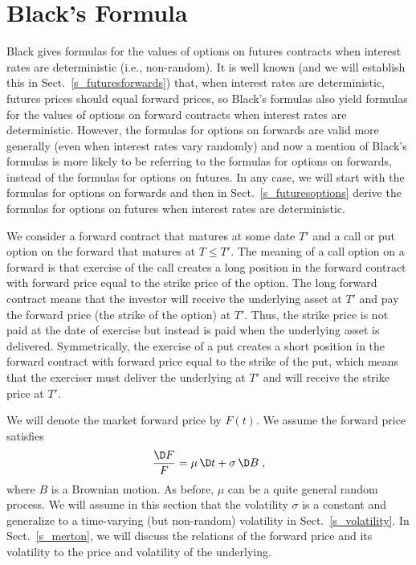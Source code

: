 \section{Black's Formula}\label{s_black}
Black \cite{Black} gives formulas for the values of options on futures contracts when interest rates are deterministic (i.e., non-random).  It is well known (and we will establish this in Sect.~\ref{s_futuresforwards}) that, when interest rates are deterministic, futures prices should equal forward prices, so Black's formulas also yield formulas for the values of options on forward contracts when interest rates are deterministic.  However, the formulas for options on forwards are valid more generally (even when interest rates vary randomly) and now a mention of Black's formulas is more likely to be referring to the formulas for options on forwards, instead of the formulas for options on futures.  In any case, we will start with  the formulas for options on forwards and then in Sect.~\ref{s_futuresoptions} derive the formulas for options on futures when interest rates are deterministic.

We consider a forward contract that matures at some date $T'$ and a call or put option on the forward that matures at $T \leq T'$.  The meaning of a call option on a forward  is that exercise of the call creates a long position in the forward contract with forward price equal to the strike price of the option.  The long forward contract means that the investor will receive the underlying asset at $T'$ and pay the forward price (the strike of the option) at $T'$.  Thus, the strike price is not paid at the date of exercise but instead is paid when the underlying asset is delivered.  Symmetrically, the exercise of a put creates a short position in the forward contract with forward price equal to the strike of the put, which means that the exerciser must deliver the underlying at $T'$ and will receive the strike price at $T'$.

We will denote the market forward price by $F(t)$.  We assume the forward price satisfies
\begin{equation}\label{dforward}
\frac{\D F}{F} = \mu\,\D t + \sigma\,\D B\;,
\end{equation}
where $B$ is a Brownian motion.  As before, $\mu$ can be a quite general random process.  We will assume in this section that the volatility $\sigma$ is a constant and generalize to a time-varying (but non-random) volatility in Sect.~\ref{s_volatility}.  In Sect.~\ref{s_merton}, we will discuss the relations of the forward price and its volatility to the price and volatility of the underlying.


